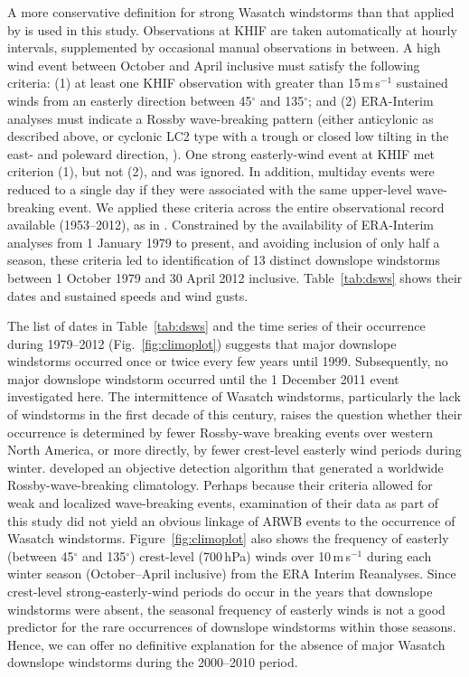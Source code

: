 \documentclass[pdftex,12pt]{article}
\def\mps{m\,s$^{-1}$}
\def\degarc{$^{\circ}$} %
\begin{document}
A more conservative definition for strong Wasatch windstorms than that applied by \citet{Holland2002} is used in this study. Observations at KHIF are taken automatically at hourly intervals, supplemented by occasional manual observations in between. A high wind event between October and April inclusive must satisfy the following criteria: (1) at least one KHIF observation with greater than 15\,\mps{} sustained winds from an easterly direction between 45\degarc{} and 135\degarc{}; and (2) ERA-Interim analyses must indicate a Rossby wave-breaking pattern (either anticylonic as described above, or cyclonic LC2 type with a trough or closed low tilting in the east- and poleward direction, \citealt{Thorncroft1993}). One strong easterly-wind event at KHIF met criterion (1), but not (2), and was ignored. In addition, multiday events were reduced to a single day if they were associated with the same upper-level wave-breaking event. We applied these criteria across the entire observational record available (1953--2012), as in \citet{Holland2002}. Constrained by the availability of ERA-Interim analyses from 1 January 1979 to present, and avoiding inclusion of only half a season, these criteria led to identification of 13 distinct downslope windstorms between 1 October 1979 and 30 April 2012 inclusive. Table~\ref{tab:dsws} shows their dates and sustained speeds and wind gusts.

The list of dates in Table~\ref{tab:dsws} and the time series of their occurrence during 1979--2012 (Fig.~\ref{fig:climoplot}) suggests that major downslope windstorms occurred once or twice every few years until 1999. Subsequently, no major downslope windstorm occurred until the 1 December 2011 event investigated here. The intermittence of Wasatch windstorms, particularly the lack of windstorms in the first decade of this century, raises the question whether their occurrence is determined by fewer Rossby-wave breaking events over western North America, or more directly, by fewer crest-level easterly wind periods during winter. \citet{Strong2008} developed an objective detection algorithm that generated a worldwide Rossby-wave-breaking climatology. Perhaps because their criteria allowed for weak and localized wave-breaking events, examination of their data as part of this study did not yield an obvious linkage of ARWB events to the occurrence of Wasatch windstorms. Figure~\ref{fig:climoplot} also shows the frequency of easterly (between 45\degarc{} and 135\degarc{}) crest-level (700\,hPa) winds over 10\,\mps{} during each winter season (October--April inclusive) from the ERA Interim Reanalyses. Since crest-level strong-easterly-wind periods do occur in the years that downslope windstorms were absent, the seasonal frequency of easterly winds is not a good predictor for the rare occurrences of downslope windstorms within those seasons. Hence, we can offer no definitive explanation for the absence of major Wasatch downslope windstorms during the 2000--2010 period.
\end{document}
